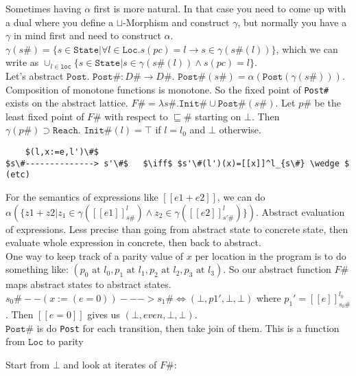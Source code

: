 \documentclass[11pt]{article}
\theoremstyle{definition}
\theoremstyle{plain}
\newcommand{\bottom}{\bot}
\begin{document}
\noindent Sometimes having $\alpha$ first is more natural. In that case you need to come up with a dual where you 
define a $\sqcup$-Morphism and construct $\gamma$, but normally you have a $\gamma$ in mind first and need to construct $\alpha$.
$\gamma(s\#) = \{s \in \texttt{State}| \forall l \in \texttt{Loc}. s(pc) = l \rightarrow s \in \gamma(s\#(l))\}$, which we can write as 
$\cup_{l \in \texttt{loc}} \{s \in \texttt{State}| s \in \gamma(s\#(l)) \wedge  s(pc) = l\}$.\\

\noindent Let's abstract $\texttt{Post}$. 
$\texttt{Post\#} : D\# \rightarrow D\#$. 
$\texttt{Post\#}(s\#) = \alpha(\texttt{Post}(\gamma(s\#)))$.
Composition of monotone functions is monotone. So the fixed point of \texttt{Post\#} exists on the abstract lattice.
$F\# = \lambda s\#. \texttt{Init\#} \cup \texttt{Post\#}(s\#)$. Let $p\#$ be the least fixed point of $F\#$ with respect to
$\sqsubseteq\#$ starting on $\bottom$. Then $\gamma(p\#) \supset \texttt{Reach}$.
$\texttt{Init}\#(l) = \top$ if $l=l_0$ and $\bottom$ otherwise.\\


\begin{lstlisting}
    $(l,x:=e,l')\#$
$s\#--------------> s'\#$   $\iff$ $s'\#(l')(x)=[[x]]^l_{s\#} \wedge $ (etc)
\end{lstlisting}


\noindent For the semantics of expressions like $[[e1+e2]]$, 
we can do $\alpha(\{z1+z2| z_1 \in \gamma([[e1]]^l_{s\#}) \wedge z_2 \in \gamma([[e2]]^l_{s'\#}) \})$. 
Abstract evaluation of expressions. Less precise than going from abstract state to concrete state, then evaluate whole expression in concrete, 
then back to abstract.\\

\noindent One way to keep track of a parity value of $x$ per location in the program is to do something like:
$(p_0 \textrm{ at } l_0, p_1 \textrm{ at }l_1, p_2 \textrm{ at }l_2, p_3 \textrm{ at }l_3)$. So our abstract function
$F\#$ maps abstract states to abstract states. $s_0\# -- (x:=(e=0))---> s_1\#  
\iff  (\bottom, p1', \bottom, \bottom)$ where $p_1' = [[e]]^{l_0}_{s_0\#}$ . 
Then $[[e=0]]$ gives us $(\bottom, even, \bottom, \bottom)$.\\

\noindent $\texttt{Post}\#$ is do \texttt{Post} for each transition, then take join of them. This is a function from $\texttt{Loc}$ to parity

\noindent Start from $\bottom$ and look at iterates of $F\#$:
\end{document}
